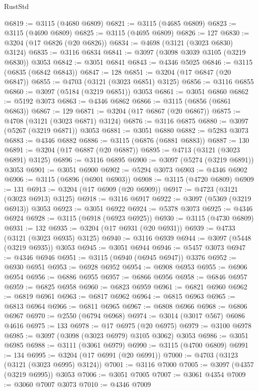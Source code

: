 \begin{lexlean}{RustStd}
\begin{coremodule}
@6819 := @3115 (@4680 @6809)
@6821 := @3115 (@4685 @6809)
@6823 := @3115 (@4690 @6809)
@6825 := @3115 (@4695 @6809)
@6826 := 127
@6830 := @3204 (@17 @6826 (@20 @6826))
@6834 := @4698 (@3121 (@3023 @6830) @3124)
@6835 := @3116 @6834
@6841 := @3097 (@3098 @3039 @3105 (@3219 @6830)) @3053
@6842 := @3051 @6841
@6843 := @4346 @5025
@6846 := @3115 (@6835 (@6842 @6843))
@6847 := 128
@6851 := @3204 (@17 @6847 (@20 @6847))
@6855 := @4703 (@3121 (@3023 @6851) @3125)
@6856 := @3116 @6855
@6860 := @3097 (@5184 (@3219 @6851)) @3053
@6861 := @3051 @6860
@6862 := @5192 @3073
@6863 := @4346 @6862
@6866 := @3115 (@6856 (@6861 @6863))
@6867 := 129
@6871 := @3204 (@17 @6867 (@20 @6867))
@6875 := @4708 (@3121 (@3023 @6871) @3124)
@6876 := @3116 @6875
@6880 := @3097 (@5267 (@3219 @6871)) @3053
@6881 := @3051 @6880
@6882 := @5283 @3073
@6883 := @4346 @6882
@6886 := @3115 (@6876 (@6881 @6883))
@6887 := 130
@6891 := @3204 (@17 @6887 (@20 @6887))
@6895 := @4713 (@3121 (@3023 @6891) @3125)
@6896 := @3116 @6895
@6900 := @3097 (@5274 (@3219 @6891)) @3053
@6901 := @3051 @6900
@6902 := @5294 @3073
@6903 := @4346 @6902
@6906 := @3115 (@6896 (@6901 @6903))
@6908 := @3115 (@4720 @6809)
@6909 := 131
@6913 := @3204 (@17 @6909 (@20 @6909))
@6917 := @4723 (@3121 (@3023 @6913) @3125)
@6918 := @3116 @6917
@6922 := @3097 (@5369 (@3219 @6913)) @3053
@6923 := @3051 @6922
@6924 := @5378 @3073
@6925 := @4346 @6924
@6928 := @3115 (@6918 (@6923 @6925))
@6930 := @3115 (@4730 @6809)
@6931 := 132
@6935 := @3204 (@17 @6931 (@20 @6931))
@6939 := @4733 (@3121 (@3023 @6935) @3125)
@6940 := @3116 @6939
@6944 := @3097 (@5448 (@3219 @6935)) @3053
@6945 := @3051 @6944
@6946 := @5457 @3073
@6947 := @4346 @6946
@6951 := @3115 (@6940 (@6945 @6947)) @3376
@6952 := @6930 @6951
@6953 := @6928 @6952
@6954 := @6908 @6953
@6955 := @6906 @6954
@6956 := @6886 @6955
@6957 := @6866 @6956
@6958 := @6846 @6957
@6959 := @6825 @6958
@6960 := @6823 @6959
@6961 := @6821 @6960
@6962 := @6819 @6961
@6963 := @6817 @6962
@6964 := @6815 @6963
@6965 := @6813 @6964
@6966 := @6811 @6965
@6967 := @6808 @6966
@6968 := @6806 @6967
@6970 := @2550 (@6794 @6968)
@6974 := @3014 (@3017 @567) @6086 @4616
@6975 := 133
@6978 := @17 @6975 (@20 @6975)
@6979 := @3100 @6978
@6985 := @3097 (@3098 (@3023 @6979) @3105 @3062) @3053
@6986 := @3051 @6985
@6988 := @3111 (@3061 @6979)
@6990 := @3115 (@4700 @6809)
@6991 := 134
@6995 := @3204 (@17 @6991 (@20 @6991))
@7000 := @4703 (@3123 (@3121 (@3023 @6995) @3124))
@7001 := @3116 @7000
@7005 := @3097 (@4357 (@3219 @6995)) @3053
@7006 := @3051 @7005
@7007 := @3061 @4354
@7009 := @3060 @7007 @3073
@7010 := @4346 @7009

\end{coremodule}
\end{lexlean}
